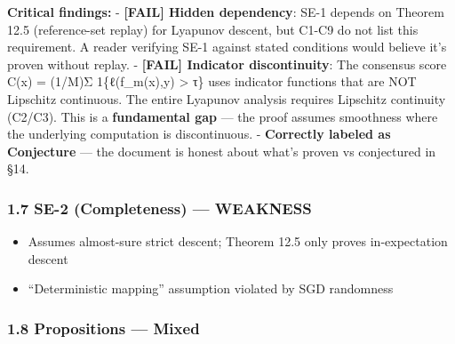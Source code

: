 \documentclass[
  12pt,
]{ctexart}
\providecommand{\tightlist}{%
  \setlength{\itemsep}{0pt}\setlength{\parskip}{0pt}}
\begin{document}
\textbf{Critical findings:} - \textbf{{[}FAIL{]} Hidden dependency}:
SE-1 depends on Theorem 12.5 (reference-set replay) for Lyapunov
descent, but C1-C9 do not list this requirement. A reader verifying SE-1
against stated conditions would believe it's proven without replay. -
\textbf{{[}FAIL{]} Indicator discontinuity}: The consensus score C(x) =
(1/M)Σ 1\{ℓ(f\_m(x),y) \textgreater{} τ\} uses indicator functions that
are NOT Lipschitz continuous. The entire Lyapunov analysis requires
Lipschitz continuity (C2/C3). This is a \textbf{fundamental gap} --- the
proof assumes smoothness where the underlying computation is
discontinuous. - \textbf{Correctly labeled as Conjecture} --- the
document is honest about what's proven vs conjectured in §14.

\subsubsection{1.7 SE-2 (Completeness) ---
WEAKNESS}\label{se-2-completeness-weakness}

\begin{itemize}
\tightlist
\item
  Assumes almost-sure strict descent; Theorem 12.5 only proves
  in-expectation descent
\item
  ``Deterministic mapping'' assumption violated by SGD randomness
\end{itemize}

\subsubsection{1.8 Propositions --- Mixed}\label{propositions-mixed}
\end{document}
